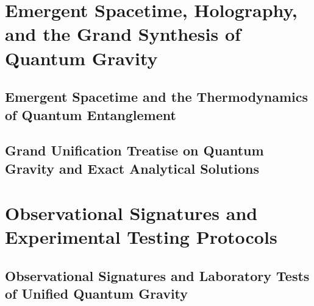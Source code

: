 \documentclass[11pt,a4paper,openright,twoside]{book}
\begin{document}
\part{Emergent Spacetime, Holography, and the Grand Synthesis of Quantum Gravity}

\chapter[Emergent Spacetime and Tensor Networks]{Emergent Spacetime and the Thermodynamics of Quantum Entanglement}


\chapter[Grand Unification Treatise on Quantum Gravity]{Grand Unification Treatise on Quantum Gravity and Exact Analytical Solutions}


\part{Observational Signatures and Experimental Testing Protocols}

\chapter[Observational Signatures and Laboratory Tests]{Observational Signatures and Laboratory Tests of Unified Quantum Gravity}


\backmatter
\end{document}
